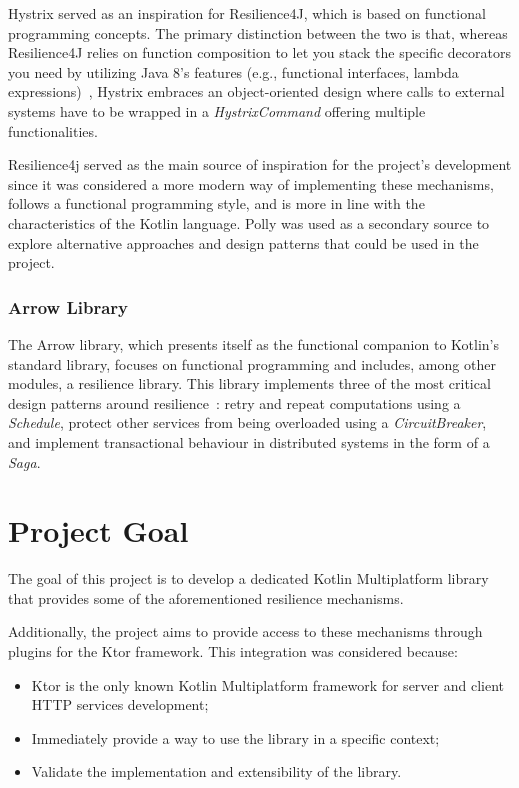 Hystrix served as an inspiration for Resilience4J, which is based on functional programming concepts.
The primary distinction between the two is that, whereas Resilience4J relies on function composition to let you stack the specific decorators you need by utilizing Java 8's features (e.g., functional interfaces, lambda expressions)~\cite{resilience4j-vs-hystrix}, Hystrix embraces an object-oriented design where calls to external systems have to be wrapped in a \textit{HystrixCommand} offering multiple functionalities.

Resilience4j served as the main source of inspiration for the project's development since it was considered a more modern way of implementing these mechanisms, follows a functional programming style, and is more in line with the characteristics of the Kotlin language.
Polly was used as a secondary source to explore alternative approaches and design patterns that could be used in the project.

\subsubsection{Arrow Library}

The Arrow library,
which presents itself as the functional companion to Kotlin's standard library,
focuses on functional programming and includes, among other modules, a resilience library.
This library implements three of the most critical design patterns around resilience~\cite{arrow-resilience}:
retry and repeat computations using a \textit{Schedule},
protect other services from being overloaded using a \textit{CircuitBreaker},
and implement transactional behaviour in distributed systems in the form of a \textit{Saga}.


\section{Project Goal}\label{sec:project-goal}

The goal of this project is
to develop a dedicated Kotlin Multiplatform library that provides some of the aforementioned resilience mechanisms.

Additionally, the project aims to provide access to these mechanisms through plugins for the Ktor framework.
This integration was considered because:

\begin{itemize}
    \item Ktor is the only known Kotlin Multiplatform framework for server and client HTTP services development;
    \item Immediately provide a way to use the library in a specific context;
    \item Validate the implementation and extensibility of the library.
\end{itemize}

